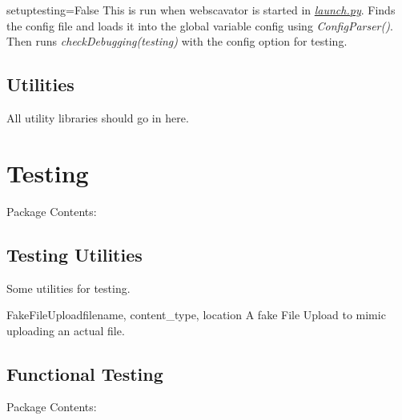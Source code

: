 \documentclass[letterpaper,10pt,english]{manual}
\begin{document}
\hypertarget{webscavator.utils.utils.setup}{}\begin{funcdesc}{setup}{testing=False}
This is run when webscavator is started in \hyperlink{--doc-launch}{\emph{launch.py}}.
Finds the config file and loads it into the global variable
config using \emph{ConfigParser()}. Then runs \emph{checkDebugging(testing)}
with the config option for testing.
\end{funcdesc}
\hypertarget{module-webscavator.utils}{}
\modulesynopsis{}

\subsection{Utilities}

All utility libraries should go in here.

\resetcurrentobjects
\hypertarget{--doc-testing}{}

\section{Testing}

Package Contents:

\resetcurrentobjects
\hypertarget{--doc-test_utils}{}

\subsection{Testing Utilities}
\hypertarget{module-webscavator.test.utils}{}
\modulesynopsis{}
Some utilities for testing.

\hypertarget{webscavator.test.utils.FakeFileUpload}{}\begin{classdesc}{FakeFileUpload}{filename, content\_type, location}
A fake File Upload to mimic uploading an actual file.
\end{classdesc}

\resetcurrentobjects
\hypertarget{--doc-functional}{}

\subsection{Functional Testing}

Package Contents:

\resetcurrentobjects
\hypertarget{--doc-test_caseController}{}
\end{document}
